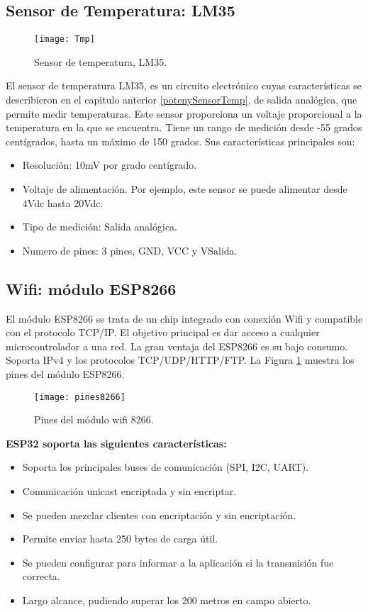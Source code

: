 \subsection{Sensor de Temperatura: LM35}

\begin{figure}[!h]
	\centering
	\texttt{[image: Tmp]}
	\caption{Sensor de temperatura, LM35.}
\end{figure}
\FloatBarrier

El sensor de temperatura LM35, es un circuito electrónico cuyas características se describieron en el capitulo anterior \ref{potenySensorTemp}, de salida analógica, que permite medir temperaturas. Este sensor proporciona un voltaje proporcional a la temperatura en la que se encuentra. Tiene un rango de medición desde -55 grados centígrados, hasta un máximo de 150 grados.
Sus características principales son:
\begin{itemize}
\item Resolución: 10mV por grado centígrado.
\item Voltaje de alimentación.  Por ejemplo, este sensor se puede alimentar desde 4Vdc hasta 20Vdc.
\item Tipo de medición: Salida analógica.
\item Numero de pines: 3 pines, GND, VCC y VSalida.
\end{itemize}


\subsection{Wifi: módulo ESP8266}

El módulo ESP8266 \cite{moduloEsp8266} se trata de un chip integrado con conexión Wifi y compatible con el protocolo TCP/IP. El objetivo principal es dar acceso a cualquier microcontrolador a una red. La gran ventaja del ESP8266 es su bajo consumo. Soporta IPv4 y los protocolos TCP/UDP/HTTP/FTP. La Figura \ref{pinesESP} muestra los pines del módulo ESP8266.

\begin{figure}[!h]
	\centering
	\texttt{[image: pines8266]}
	\caption{Pines del módulo wifi 8266.}\label{pinesESP}
\end{figure}

\textbf{ESP32 soporta las siguientes características:}
\begin{itemize}
\item Soporta los principales buses de comunicación (SPI, I2C, UART).
\item Comunicación unicast encriptada y sin encriptar.
\item Se pueden mezclar clientes con encriptación y sin encriptación.
\item Permite enviar hasta 250 bytes de carga útil.
\item Se pueden configurar  para informar a la aplicación si la transmisión fue correcta.
\item Largo alcance, pudiendo superar los 200 metros en campo abierto.
\end{itemize}


